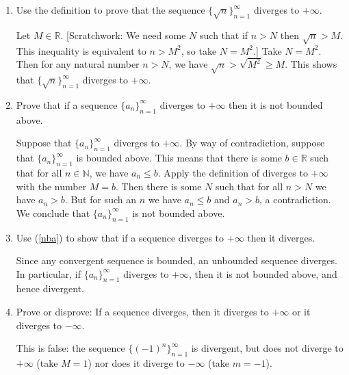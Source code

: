 \documentclass[12pt]{amsart}
\newcommand{\R}{{\mathbb{R}}}
\newcommand{\N}{\mathbb{N}}
\numberwithin{equation}{section}
\theoremstyle{plain} %
\theoremstyle{definition}
\theoremstyle{remark}
\begin{document}
\begin{enumerate}


\item Use the definition to prove that the sequence $\{ \sqrt{n} \}_{n=1}^\infty$ diverges to $+\infty$.

\begin{framed}
Let $M\in \R$. [Scratchwork: We need some $N$ such that if $n>N$ then $\sqrt{n} > M$. This inequality is equivalent to $n > M^2$, so take $N=M^2$.] Take $N=M^2$. Then for any natural number $n>N$, we have $\sqrt{n} > \sqrt{M^2} \geq M$. This shows that  $\{ \sqrt{n} \}_{n=1}^\infty$ diverges to $+\infty$.
\end{framed}


\item\label{nba} Prove that if a sequence $\{ a_n\}_{n=1}^\infty$ diverges to $+\infty$ then it is not bounded above. 

\begin{framed}
Suppose that $\{ a_n\}_{n=1}^\infty$ diverges to $+\infty$. By way of contradiction, suppose that $\{ a_n\}_{n=1}^\infty$ is bounded above. This means that there is some $b\in \R$ such that for all $n\in \N$, we have $a_n\leq b$. Apply the definition of diverges to $+\infty$ with the number $M=b$. Then there is some $N$ such that for all $n>N$ we have $a_n>b$. But for such an $n$ we have $a_n\leq b$ and $a_n>b$, a contradiction. We conclude that $\{ a_n\}_{n=1}^\infty$ is not bounded above.
\end{framed}


\item Use (\ref{nba}) to show that if a sequence diverges to $+\infty$ then it diverges.

\begin{framed}
Since any convergent sequence is bounded, an unbounded sequence diverges. In particular, if $\{ a_n\}_{n=1}^\infty$ diverges to $+\infty$, then it is not bounded above, and hence divergent.
\end{framed}

\item Prove or disprove: If a sequence diverges, then it diverges to $+\infty$ or it diverges to $-\infty$.

\begin{framed}
This is false: the sequence $\{(-1)^n\}_{n=1}^\infty$ is divergent, but does not diverge to $+\infty$ (take $M=1$) nor does it diverge to $-\infty$ (take $m=-1$).
\end{framed}



\end{enumerate}
\end{document}
